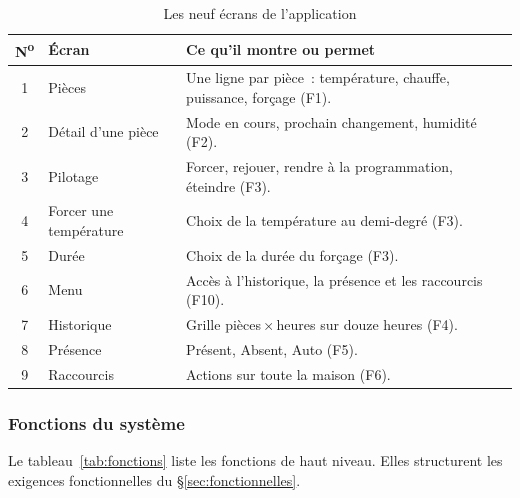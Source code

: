 \begin{table}[H]
  \centering\small
  \begin{tabularx}{\linewidth}{@{}clX@{}}
    \toprule
    \textbf{N\textsuperscript{o}} & \textbf{Écran} & \textbf{Ce qu'il montre ou permet} \\
    \midrule
    1  & Pièces                  & Une ligne par pièce~: température, chauffe, puissance, forçage (F1). \\
    2  & Détail d'une pièce      & Mode en cours, prochain changement, humidité (F2). \\
    3  & Pilotage                & Forcer, rejouer, rendre à la programmation, éteindre (F3). \\
    4  & Forcer une température  & Choix de la température au demi-degré (F3). \\
    5  & Durée                   & Choix de la durée du forçage (F3). \\
    6  & Menu                    & Accès à l'historique, la présence et les raccourcis (F10). \\
    7  & Historique              & Grille pièces\,×\,heures sur douze heures (F4). \\
    8  & Présence                & Présent, Absent, Auto (F5). \\
    9  & Raccourcis              & Actions sur toute la maison (F6). \\
    \bottomrule
  \end{tabularx}
  \caption{Les neuf écrans de l'application}
  \label{tab:ecrans}
\end{table}

\subsubsection{Fonctions du système}

Le tableau~\ref{tab:fonctions} liste les fonctions de haut niveau. Elles structurent les
exigences fonctionnelles du §\ref{sec:fonctionnelles}.

